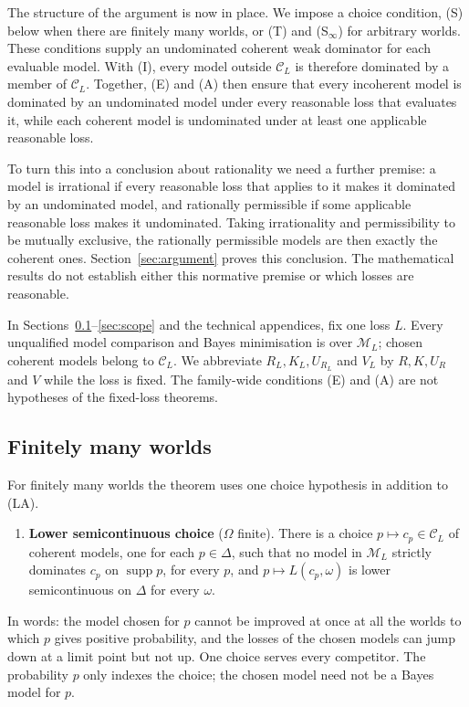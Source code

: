 \documentclass[11pt]{article}
\theoremstyle{definition}
\theoremstyle{remark}
\newcommand{\M}{\mathcal M}
\newcommand{\C}{\mathcal C}
\newcommand{\supp}{\operatorname{supp}}
\begin{document}
The structure of the argument is now in place. We impose a choice condition, (S) below when there are finitely many worlds, or (T) and (S$_\infty$) for arbitrary worlds. These conditions supply an undominated coherent weak dominator for each evaluable model. With (I), every model outside $\C_L$ is therefore dominated by a member of $\C_L$. Together, (E) and (A) then ensure that every incoherent model is dominated by an undominated model under every reasonable loss that evaluates it, while each coherent model is undominated under at least one applicable reasonable loss.

To turn this into a conclusion about rationality we need a further premise: a model is irrational if every reasonable loss that applies to it makes it dominated by an undominated model, and rationally permissible if some applicable reasonable loss makes it undominated. Taking irrationality and permissibility to be mutually exclusive, the rationally permissible models are then exactly the coherent ones. Section~\ref{sec:argument} proves this conclusion. The mathematical results do not establish either this normative premise or which losses are reasonable.

In Sections~\ref{sec:kkm}--\ref{sec:scope} and the technical appendices, fix one loss $L$. Every unqualified model comparison and Bayes minimisation is over $\M_L$; chosen coherent models belong to $\C_L$. We abbreviate $R_L,K_L,U_{R_L}$ and $V_L$ by $R,K,U_R$ and $V$ while the loss is fixed. The family-wide conditions (E) and (A) are not hypotheses of the fixed-loss theorems.

\subsection{Finitely many worlds}\label{sec:kkm}
\noindent For finitely many worlds the theorem uses one choice hypothesis in addition to (LA).
\begin{enumerate}[label=\textbf{(S)},leftmargin=*]
\item \textbf{Lower semicontinuous choice} ($\Omega$ finite). There is a choice $p\mapsto c_p\in\C_L$ of coherent models, one for each $p\in\Delta$, such that no model in $\M_L$ strictly dominates $c_p$ on $\supp p$, for every $p$, and $p\mapsto L(c_p,\omega)$ is lower semicontinuous on $\Delta$ for every $\omega$.
\end{enumerate}
In words: the model chosen for $p$ cannot be improved at once at all the worlds to which $p$ gives positive probability, and the losses of the chosen models can jump down at a limit point but not up. One choice serves every competitor. The probability $p$ only indexes the choice; the chosen model need not be a Bayes model for $p$.
\end{document}

